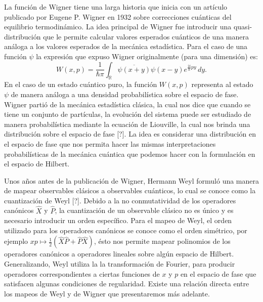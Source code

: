 \documentclass[a4paper]{report}
\DeclareMathOperator{\R}{\mathbb{R}}
\begin{document}
  La función de Wigner tiene una larga historia que inicia
  con un artículo publicado por Eugene P. Wigner en 1932
  \cite{wignerQuantumCorrectionThermodynamic1932} sobre
  correcciones cuánticas del equilibrio termodinámico. La
  idea principal de Wigner fue introducir una
  quasi-distribución que le permite calcular valores
  esperados cuánticos de una manera análoga a los valores
  esperados de la mecánica estadística. Para el caso de una
  función $\psi$ la expresión que expuso Wigner
  originalmente (para una dimensión) es:
  \begin{equation}
    \label{eqn:wigners_original}
    W(x,p)
    = \frac{1}{\hbar \pi} \int_{\R}
    \overline{\psi(x+y)}\psi(x-y) e^{\frac{2i}{\hbar}py} \,
    dy.
  \end{equation}
  En el caso de un estado cuántico puro, la función $W(x,p)$
  representa al estado $\psi$ de manera análoga a una
  densidad probabilística sobre el espacio de fase. Wigner
  partió de la mecánica estadística clásica, la cual nos
  dice que cuando se tiene un conjunto de partículas, la
  evolución del sistema puede ser estudiado de manera
  probabilística mediante la ecuación de Liouville, la cual
  nos brinda una distribución sobre el espacio de fase [?].
  La idea es considerar una distribución en el espacio de
  fase que nos permita hacer las mismas interpretaciones
  probabilísticas de la mecánica cuántica que podemos hacer
  con la formulación en el espacio de Hilbert.

  Unos años antes de la publicación de Wigner, Hermann Weyl
  formuló una manera de mapear observables clásicos a
  observables cuánticos, lo cual se conoce como la
  cuantización de Weyl [?]. Debido a la no conmutatividad de
  los operadores canónicos $\hat X$ y $\hat P$, la
  cuantización de un observable clásico no es único y es
  necesario introducir un orden específico. Para el mapeo de
  Weyl, el orden utilizado para los operadores canónicos se
  conoce como el orden simétrico, por ejemplo $xp \mapsto
  \frac{1}{2}\left( \hat{X} \hat{P} + \hat{P} \hat{X}
  \right)$, ésto nos permite mapear polinomios de los
  operadores canónicos a operadores lineales sobre algún
  espacio de Hilbert. Generalizando, Weyl utiliza la la
  transformación de Fourier, para producir operadores
  correspondientes a ciertas funciones de $x$ y $p$ en el
  espacio de fase que satisfacen algunas condiciones de
  regularidad. Existe una relación directa entre los mapeos
  de Weyl y de Wigner que presentaremos más adelante. 
\end{document}

